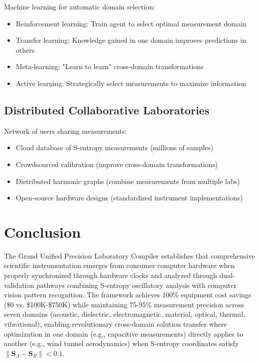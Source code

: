 \documentclass[12pt,a4paper]{article}
\begin{document}
{{{{{{{{{{{{{{{{{\begin{algorithm}
{{{{{{{{{Machine learning for automatic domain selection:

\begin{itemize}
\item Reinforcement learning: Train agent to select optimal measurement domain
\item Transfer learning: Knowledge gained in one domain improves predictions in others
\item Meta-learning: "Learn to learn" cross-domain transformations
\item Active learning: Strategically select measurements to maximize information
\end{itemize}

\subsection{Distributed Collaborative Laboratories}

Network of users sharing measurements:

\begin{itemize}
\item Cloud database of S-entropy measurements (millions of samples)
\item Crowdsourced calibration (improve cross-domain transformations)
\item Distributed harmonic graphs (combine measurements from multiple labs)
\item Open-source hardware designs (standardized instrument implementations)
\end{itemize}

\section{Conclusion}

The Grand Unified Precision Laboratory Compiler establishes that comprehensive scientific instrumentation emerges from consumer computer hardware when properly synchronized through hardware clocks and analyzed through dual-validation pathways combining S-entropy oscillatory analysis with computer vision pattern recognition. The framework achieves 100\% equipment cost savings (\$0 vs. \$100K-\$750K) while maintaining 75-95\% measurement precision across seven domains (acoustic, dielectric, electromagnetic, material, optical, thermal, vibrational), enabling revolutionary cross-domain solution transfer where optimization in one domain (e.g., capacitive measurements) directly applies to another (e.g., wind tunnel aerodynamics) when S-entropy coordinates satisfy $\|\mathbf{S}_A - \mathbf{S}_B\| < 0.1$.

}}}}}}}}}
\end{algorithm}}}}}}}}}}}}}}}}}}
\end{document}
